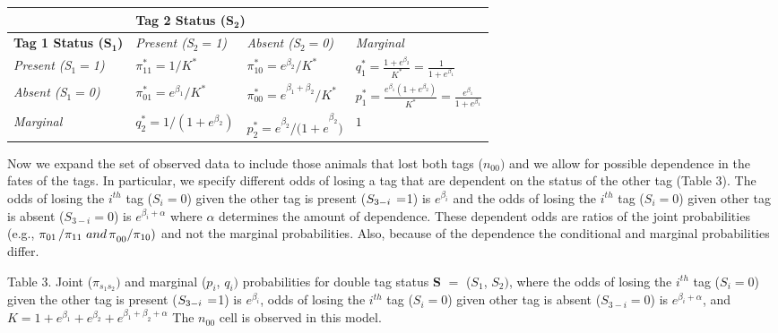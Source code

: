 \documentclass{article}
\begin{document}
\begin{table}[htbp]
\begin{center}
\begin{tabular}{|l|p{103pt}|p{103pt}|p{171pt}|}
\hline
& 
\multicolumn{2}{|p{207pt}|}{\textbf{Tag 2 Status (S}$_{\mathrm{\mathbf{2}}}$\textbf{)}} & 
 \\
\hline
\textbf{Tag 1 Status (S}$_{\mathrm{\mathbf{1}}}$\textbf{)}& 
\textit{Present (S}$_{2}=$\textit{1)}& 
\textit{Absent (S}$_{2}=$\textit{0)}& 
\textit{Marginal} \\
\hline
\textit{Present (S}$_{1}=$\textit{1)}& 
$\pi_{11}^{\ast }=1/K^{\ast }$& 
$\pi_{10}^{\ast }=e^{\beta_{2}}/K^{\ast }$& 
$q_{1}^{\ast }=\frac{1+e^{\beta_{2}}}{K^{\ast }}=\frac{1}{1+e^{\beta_{1}}}$ \\
\hline
\textit{Absent (S}$_{1}=$\textit{0)}& 
$\pi_{01}^{\ast }=e^{\beta_{1}}/K^{\ast }$& 
${\pi_{00}^{\ast }=e}^{\beta_{1}+\beta_{2}}/K^{\ast }$& 
$p_{1}^{\ast }=\frac{e^{\beta_{1}}\left( 1+e^{\beta_{2}} \right)}{K^{\ast }}=\frac{e^{\beta_{1}}}{1+e^{\beta_{1}}}$ \\
\hline
\textit{Marginal}& 
$q_{2}^{\ast }=1/(1+e^{\beta_{2}})$& 
${{p_{2}^{\ast }=e}^{\beta_{2}}/(1+e}^{\beta_{2}})$& 
$1$ \\
\hline
\end{tabular}
\label{tab2}
\end{center}
\end{table}

Now we expand the set of observed data to include those animals that lost 
both tags ($n_{00})$ and we allow for possible dependence in the fates of 
the tags. In particular, we specify different odds of losing a tag that are 
dependent on the status of the other tag (Table 3). The odds of losing the 
$i^{th}$ tag ($S_{i}=$0) given the other tag is present ($S_{3-i\thinspace 
}=$1) is $e^{\beta_{i}}$ and the odds of losing the $i^{th}$ tag 
($S_{i}=$0) given other tag is absent ($S_{3-i}=$0) is $e^{\beta 
_{i}+\alpha }$ where $\alpha $ determines the amount of dependence. These 
dependent odds are ratios of the joint probabilities (e.g., ${\pi 
_{01\thinspace }/\pi_{11\thinspace }\thinspace and\thinspace \pi }_{00}/\pi 
_{10})$ and not the marginal probabilities. Also, because of the dependence 
the conditional and marginal probabilities differ.

Table 3. Joint ($\pi_{s_{1}s_{2}})$ and marginal ($p_{i}$, $q_{i})$ 
probabilities for double tag status \textbf{S} $=$ ($S_{\mathrm{1}}$, 
$S_{\mathrm{2}})$, where the odds of losing the $i^{th}$ tag ($S_{i}=$0) 
given the other tag is present ($S_{3-i\thinspace }=$1) is $e^{\beta 
_{i}}$, odds of losing the $i^{th}$ tag ($S_{i}=$0) given other tag is 
absent ($S_{3-i}=$0) is $e^{\beta_{i}+\alpha }$, and $K=1+e^{\beta 
_{1}}+e^{\beta_{2}}+e^{{\beta_{1}+\beta }_{2}+\alpha }$ The $n_{00}$ cell 
is observed in this model. 
\end{document}
